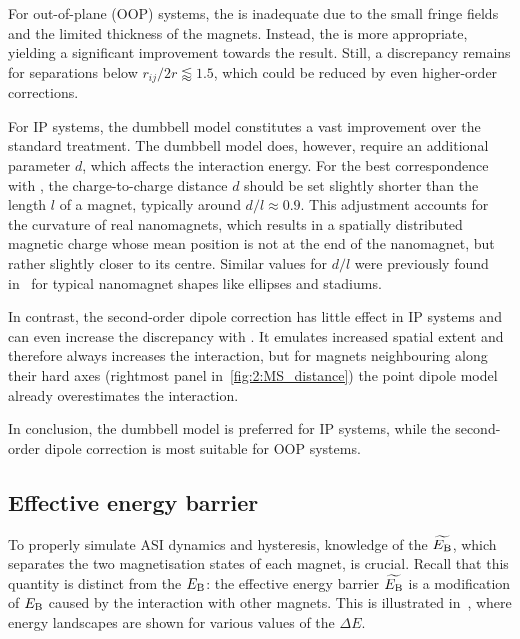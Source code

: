 For out-of-plane (OOP) systems, the  is inadequate due to the small fringe fields and the limited thickness of the magnets.
Instead, the  is more appropriate, yielding a significant improvement towards the \mumax result.
Still, a discrepancy remains for separations below $r_{ij}/2r \lessapprox 1.5$, which could be reduced by even higher-order corrections. \\\par

For IP systems, the dumbbell model constitutes a vast improvement over the standard  treatment.
The dumbbell model does, however, require an additional parameter $d$, which affects the interaction energy.
For the best correspondence with \mumax, the charge-to-charge distance $d$ should be set slightly shorter than the length $l$ of a magnet, typically around $d/l\approx0.9$. %
This adjustment accounts for the curvature of real nanomagnets, which results in a spatially distributed magnetic charge whose mean position is not at the end of the nanomagnet, but rather slightly closer to its centre.
Similar values for $d/l$ were previously found in~ for typical nanomagnet shapes like ellipses and stadiums. \par
In contrast, the second-order dipole correction has little effect in IP systems and can even increase the discrepancy with \mumax.
It emulates increased spatial extent and therefore always increases the interaction, but for magnets neighbouring along their hard axes (rightmost panel in~\cref{fig:2:MS_distance}) the point dipole model already overestimates the interaction. \par
In conclusion, the dumbbell model is preferred for IP systems, while the second-order dipole correction is most suitable for OOP systems.

\subsection{Effective energy barrier}\label{sec:2:E_B_eff}
To properly simulate ASI dynamics and hysteresis, knowledge of the  $\widetilde{E_\mathrm{B}}$, which separates the two magnetisation states of each magnet, is crucial.
Recall that this quantity is distinct from the  $E_\mathrm{B}$: the effective energy barrier $\widetilde{E_\mathrm{B}}$ is a modification of $E_\mathrm{B}$ caused by the interaction with other magnets. 
This is illustrated in~, where energy landscapes are shown for various values of the  $\Delta E$. \par

